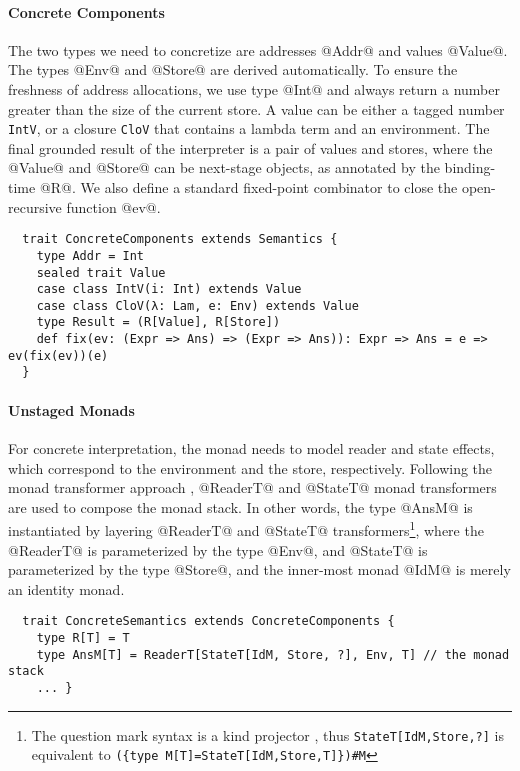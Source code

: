 \paragraph{Concrete Components}
The two types we need to concretize are addresses @Addr@ and values @Value@. The
types @Env@ and @Store@ are derived automatically. To ensure the freshness of
address allocations, we use type @Int@ and always return a number greater
than the size of the current store.
A value can be either a tagged number \texttt{IntV}, or a closure
\texttt{CloV} that contains a lambda term and an environment. The final grounded
result of the interpreter is a pair of values and stores, where the @Value@ and
@Store@ can be next-stage objects, as annotated by the binding-time @R@. We
also define a standard fixed-point combinator to close the open-recursive
function @ev@.
\begin{lstlisting}
  trait ConcreteComponents extends Semantics {
    type Addr = Int
    sealed trait Value
    case class IntV(i: Int) extends Value
    case class CloV(λ: Lam, e: Env) extends Value
    type Result = (R[Value], R[Store])
    def fix(ev: (Expr => Ans) => (Expr => Ans)): Expr => Ans = e => ev(fix(ev))(e)
  }
\end{lstlisting}

\paragraph{Unstaged Monads}
For concrete interpretation, the monad needs to model reader and state
effects, which correspond to the environment and the store, respectively. Following
the monad transformer approach \cite{DBLP:conf/popl/LiangHJ95}, @ReaderT@ and
@StateT@ monad transformers are used to compose the monad stack. In other words,
the type @AnsM@ is instantiated by layering @ReaderT@ and @StateT@
transformers\footnote{The question mark syntax is a kind projector
\cite{kindprojector}, thus \texttt{StateT[IdM,Store,?]} is equivalent to
\newline \texttt{(\{type M[T]=StateT[IdM,Store,T]\})\#M}}, where the @ReaderT@
is parameterized by the type @Env@, and @StateT@ is parameterized by the type @Store@,
and the inner-most monad @IdM@ is merely an identity monad.
\begin{lstlisting}
  trait ConcreteSemantics extends ConcreteComponents {
    type R[T] = T
    type AnsM[T] = ReaderT[StateT[IdM, Store, ?], Env, T] // the monad stack
    ... }
\end{lstlisting}

